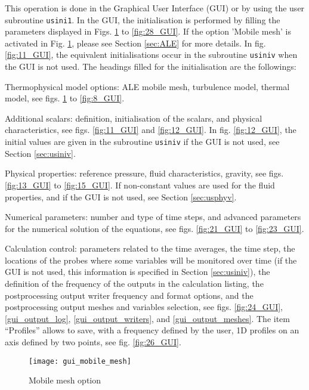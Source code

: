 {{This operation is done in the Graphical User Interface (GUI) or by using the user subroutine \texttt{usini1}.
In the GUI, the initialisation is performed by filling the parameters displayed in Figs. \ref{fig:6_GUI} to \ref{fig:28_GUI}. If the option 'Mobile mesh' is activated in Fig. \ref{fig:6_GUI}, please see Section \ref{sec:ALE} for more details. In fig. \ref{fig:11_GUI}, the equivalent initialisations occur in the subroutine \texttt{usiniv} when the GUI is not used.
The headings filled for the initialisation are the followings:
\begin{list}{-}{}
\item Thermophysical model options: ALE mobile mesh,
      turbulence model, thermal model, see figs. \ref{fig:6_GUI} to \ref{fig:8_GUI}.
\item Additional scalars: definition, initialisation of the scalars, and physical characteristics, see figs. \ref{fig:11_GUI} and \ref{fig:12_GUI}. In fig. \ref{fig:12_GUI}, the initial values are given in the subroutine \texttt{usiniv} if the GUI is not used, see Section \ref{sec:usiniv}.
\item Physical properties: reference pressure, fluid characteristics, gravity, see figs. \ref{fig:13_GUI} to \ref{fig:15_GUI}. If non-constant values are used for the fluid properties, and if the GUI is not used, see Section \ref{sec:usphyv}.
\item Numerical parameters: number and type of time steps, and advanced parameters for the numerical solution of the equations, see figs. \ref{fig:21_GUI} to \ref{fig:23_GUI}.
\item Calculation control: parameters related to the time averages, the time step, the
      locations of the probes where some variables will be monitored over time
      (if the GUI is not used, this information is specified in Section
      \ref{sec:usiniv}), the definition of the frequency of the outputs in the calculation
      listing, the postprocessing output writer frequency and format options, and
      the postprocessing output meshes and variables selection, see
      figs. \ref{fig:24_GUI}, \ref{gui_output_log}, \ref{gui_output_writers},
      and \ref{gui_output_meshes}. The item ``Profiles'' allows to save, with a
      frequency defined by the user, 1D profiles on an axis defined by two
      points, see fig. \ref{fig:26_GUI}.
\end{list}

\begin{figure}[!ht]
\begin{center}
\texttt{[image: gui\_mobile\_mesh]}
\caption{Mobile mesh option}
\label{fig:6_GUI}
\end{center}
\end{figure}

}}
